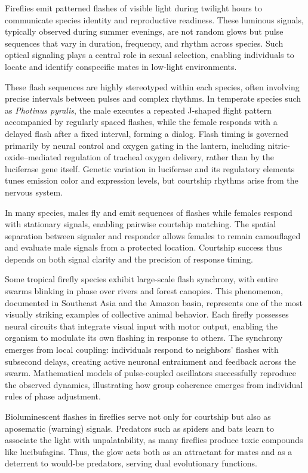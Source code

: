 Fireflies emit patterned flashes of visible light during twilight hours to communicate species identity and reproductive readiness. These luminous signals, typically observed during summer evenings, are not random glows but pulse sequences that vary in duration, frequency, and rhythm across species. Such optical signaling plays a central role in sexual selection, enabling individuals to locate and identify conspecific mates in low-light environments.

These flash sequences are highly stereotyped within each species, often involving precise intervals between pulses and complex rhythms. In temperate species such as \emph{Photinus pyralis}, the male executes a repeated J-shaped flight pattern accompanied by regularly spaced flashes, while the female responds with a delayed flash after a fixed interval, forming a dialog. Flash timing is governed primarily by neural control and oxygen gating in the lantern, including nitric-oxide–mediated regulation of tracheal oxygen delivery, rather than by the luciferase gene itself. Genetic variation in luciferase and its regulatory elements tunes emission color and expression levels, but courtship rhythms arise from the nervous system.

In many species, males fly and emit sequences of flashes while females respond with stationary signals, enabling pairwise courtship matching. The spatial separation between signaler and responder allows females to remain camouflaged and evaluate male signals from a protected location. Courtship success thus depends on both signal clarity and the precision of response timing.

Some tropical firefly species exhibit large-scale flash synchrony, with entire swarms blinking in phase over rivers and forest canopies. This phenomenon, documented in Southeast Asia and the Amazon basin, represents one of the most visually striking examples of collective animal behavior. Each firefly possesses neural circuits that integrate visual input with motor output, enabling the organism to modulate its own flashing in response to others. The synchrony emerges from local coupling: individuals respond to neighbors' flashes with subsecond delays, creating active neuronal entrainment and feedback across the swarm. Mathematical models of pulse-coupled oscillators successfully reproduce the observed dynamics, illustrating how group coherence emerges from individual rules of phase adjustment.

Bioluminescent flashes in fireflies serve not only for courtship but also as aposematic (warning) signals. Predators such as spiders and bats learn to associate the light with unpalatability, as many fireflies produce toxic compounds like lucibufagins. Thus, the glow acts both as an attractant for mates and as a deterrent to would-be predators, serving dual evolutionary functions.

